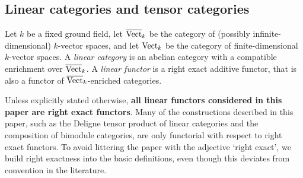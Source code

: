 \documentclass{amsart}
\begin{document}
\subsection{Linear categories and tensor categories} \label{sec:tc-lincat}

	Let $k$ be a fixed ground field, let $\overline{\mathrm{Vect}}_k$ be the category of (possibly infinite-dimensional) $k$-vector spaces, and let $\mathrm{Vect}_k$ be the category of finite-dimensional $k$-vector spaces.   A {\em linear category} is an abelian category with a compatible enrichment over $\overline{\mathrm{Vect}}_k$. 
A {\em linear functor} is a right exact additive functor, that is also a functor of $\overline{\mathrm{Vect}}_k$-enriched categories. 

\begin{warning}
	Unless explicitly stated otherwise, {\bfseries all linear functors considered in this paper are  right exact functors}.  Many of the constructions described in this paper, such as the Deligne tensor product of linear categories and the composition of bimodule categories, are only functorial with respect to right exact functors. To avoid littering the paper with the adjective `right exact', we build right exactness into the basic definitions, even though this deviates from convention in the literature.  
\end{warning}

\end{document}

